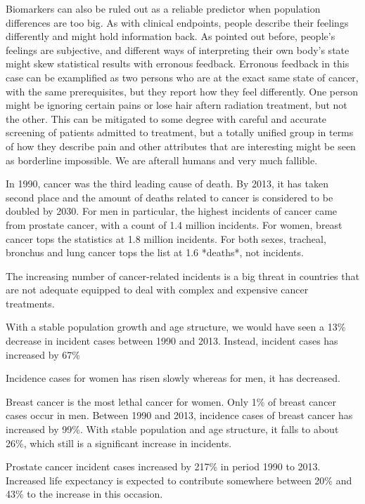 \documentclass[UKenglish]{ifimaster}
\begin{document}
Biomarkers can also be ruled out as a reliable predictor when population differences are too big. As with clinical
endpoints, people describe their feelings differently and might hold information back. As pointed out before, people's
feelings are subjective, and different ways of interpreting their own body's state might skew statistical results with
erronous feedback. Erronous feedback in this case can be examplified as two persons who are at the exact same state of
cancer, with the same prerequisites, but they report how they feel differently. One person might be ignoring certain
pains or lose hair aftern radiation treatment, but not the other. This can be mitigated to some degree with careful and
accurate screening of patients admitted to treatment, but a totally unified group in terms of how they describe pain and
other attributes that are interesting might be seen as borderline impossible. We are afterall humans and very much
fallible.

In 1990, cancer was the third leading cause of death. By 2013, it has taken second place and the amount of deaths
related to cancer is considered to be doubled by 2030. For men in particular, the highest incidents of cancer came from
prostate cancer, with a count of 1.4 million incidents. For women, breast cancer tops the statistics at 1.8 million
incidents. For both sexes, tracheal, bronchus and lung cancer tops the list at 1.6 *deaths*, not incidents.

The increasing number of cancer-related incidents is a big threat in countries that are not adequate equipped to deal
with complex and expensive cancer treatments.

With a stable population growth and age structure, we would have seen a 13\% decrease in incident cases between 1990 and
2013. Instead, incident cases has increased by 67\%

Incidence cases for women has risen slowly whereas for men, it has decreased.

Breast cancer is the most lethal cancer for women. Only 1\% of breast cancer cases occur in men. Between 1990 and 2013,
incidence cases of breast cancer has increased by 99\%. With stable population and age structure, it falls to about
26\%, which still is a significant increase in incidents.

Prostate cancer incident cases increased by 217\% in period 1990 to 2013.  Increased life expectancy is expected to
contribute somewhere between 20\% and 43\% to the increase in this occasion.
\end{document}
